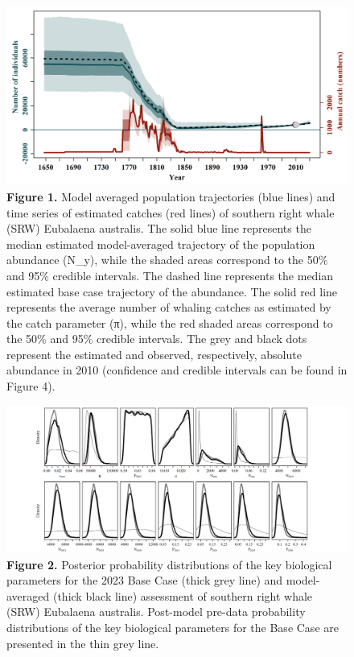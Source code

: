 \documentclass[
]{article}
\begin{document}
\begin{figure}
\centering
\includegraphics{Model runs/Model_average/Model_average_trajectory_summary.png}
\caption{\textbf{Figure 1.} Model averaged population trajectories (blue
lines) and time series of estimated catches (red lines) of southern
right whale (SRW) Eubalaena australis. The solid blue line represents
the median estimated model-averaged trajectory of the population
abundance (N\_y), while the shaded areas correspond to the 50\% and 95\%
credible intervals. The dashed line represents the median estimated base
case trajectory of the abundance. The solid red line represents the
average number of whaling catches as estimated by the catch parameter
(π), while the red shaded areas correspond to the 50\% and 95\% credible
intervals. The grey and black dots represent the estimated and observed,
respectively, absolute abundance in 2010 (confidence and credible
intervals can be found in Figure 4).}
\end{figure}

\newpage

\begin{figure}
\centering
\includegraphics{Model runs/Model_average/Model_average_posterior_density.png}
\caption{\textbf{Figure 2.} Posterior probability distributions of the
key biological parameters for the 2023 Base Case (thick grey line) and
model-averaged (thick black line) assessment of southern right whale
(SRW) Eubalaena australis. Post-model pre-data probability distributions
of the key biological parameters for the Base Case are presented in the
thin grey line.}
\end{figure}
\end{document}
